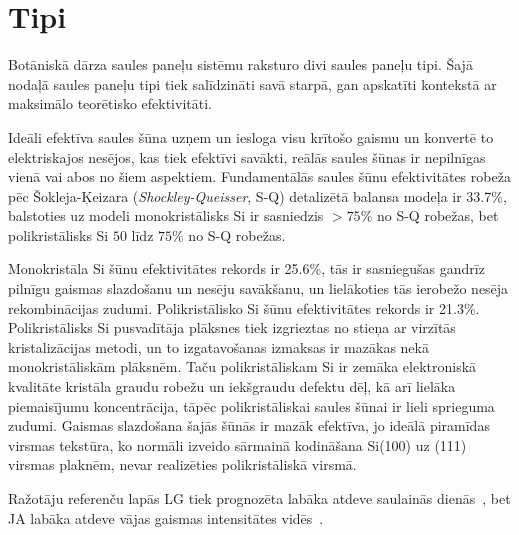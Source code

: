 
\section{Tipi} \label{section:tipi}


Botāniskā dārza saules paneļu sistēmu raksturo divi saules paneļu tipi. Šajā nodaļā saules paneļu tipi tiek salīdzināti savā starpā, gan apskatīti kontekstā ar maksimālo teorētisko efektivitāti.

Ideāli efektīva saules šūna uzņem un iesloga visu krītošo gaismu un 
konvertē to elektriskajos nesējos, kas tiek efektīvi savākti, reālās saules šūnas ir nepilnīgas vienā vai abos no šiem aspektiem. Fundamentālās saules šūnu efektivitātes robeža pēc Šokleja-Ķeizara (\textit{Shockley-Queisser}, S-Q) detalizētā balansa modeļa ir 33.7\%, balstoties uz modeli monokristālisks Si ir sasniedzis $>75\%$ no S-Q robežas, bet polikristālisks Si $50$ līdz $75\%$ no S-Q robežas.~\cite{polman2016}

Monokristāla Si šūnu efektivitātes rekords ir 25.6\%, tās ir sasniegušas gandrīz pilnīgu gaismas slazdošanu un nesēju savākšanu, un lielākoties tās ierobežo nesēja rekombinācijas zudumi. Polikristālisko Si šūnu efektivitātes rekords ir 21.3\%.
Polikristālisks Si pusvadītāja plāksnes tiek izgrieztas no stieņa ar virzītās kristalizācijas metodi, un to izgatavošanas izmaksas ir mazākas nekā monokristāliskām plāksnēm. Taču polikristāliskam Si ir zemāka elektroniskā kvalitāte kristāla graudu robežu un iekšgraudu defektu dēļ, kā arī lielāka piemaisījumu koncentrācija, tāpēc polikristāliskai saules šūnai ir lieli sprieguma zudumi. Gaismas slazdošana šajās šūnās ir mazāk efektīva, jo ideālā piramīdas virsmas tekstūra, ko normāli izveido sārmainā kodināšana Si(100) uz (111) virsmas plaknēm, nevar realizēties polikristāliskā virsmā.~\cite{polman2016}

Ražotāju referenču lapās LG tiek prognozēta labāka atdeve saulainās dienās~\cite{LGtips}, bet JA labāka atdeve vājas gaismas intensitātes vidēs~\cite{JAtips}.

